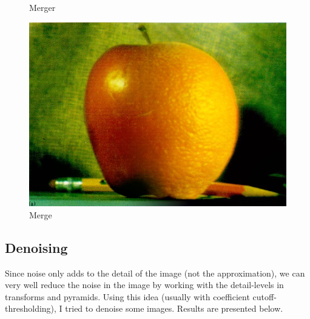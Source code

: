 \documentclass{article}
\begin{document}
    \begin{figure}[!htb]
      \caption{Merger}
    \endminipage \hfill
      \includegraphics[scale=.3]{./blending/ao/final_3.png}
      \caption{Merge}
    \endminipage \hfill
    \end{figure}
    
    \pagebreak
    \subsection*{Denoising}
    Since noise only adds to the detail of the image (not the approximation), we can very well reduce the noise in the image by working with the detail-levels in transforms and pyramids. Using this idea (usually with coefficient cutoff-thresholding), I tried to denoise some images. Results are presented below.\\[1pt]
    
\end{document}
